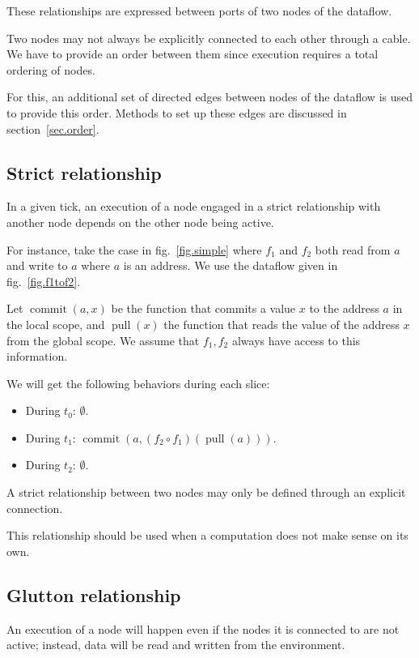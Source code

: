\documentclass{article}
\DeclareMathOperator{\commit}{commit}
\DeclareMathOperator{\pull}{pull}
\begin{document}
These relationships are expressed between ports of two nodes of the dataflow.

Two nodes may not always be explicitly connected to each other through a cable. 
We have to provide an order between them since execution requires a total ordering of nodes.

For this, an additional set of directed edges between nodes of the dataflow is used to provide this order.
Methods to set up these edges are discussed in section~\ref{sec.order}.
\subsection{Strict relationship}
In a given tick, an execution of a node engaged in a strict relationship with another node depends on the other node being active.
        
For instance, take the case in fig.~\ref{fig.simple} where $f_1$ and $f_2$ both read from $a$ and write to $a$ where $a$ is an address.
We use the dataflow given in fig.~\ref{fig.f1tof2}.
    
Let $\commit(a, x)$ be the function that commits a value $x$ to the address $a$ in the local scope, and $\pull(x)$ the function that reads the value of the address $x$ from the global scope.
We assume that $f_1, f_2$ always have access to this information.
    
We will get the following behaviors during each slice: 
\begin{itemize}
  \item During $t_0$: $\emptyset$.
  \item During $t_1$: $\commit(a, (f_2 \circ f_1)(\pull(a)))$.
  \item During $t_2$: $\emptyset$. 
\end{itemize}

A strict relationship between two nodes may only be defined through an explicit connection.

This relationship should be used when a computation does not make sense on its own.

    
\subsection{Glutton relationship}
An execution of a node will happen even if the nodes it is connected to are not active; instead, data will be read and written from the environment.
    
\end{document}
